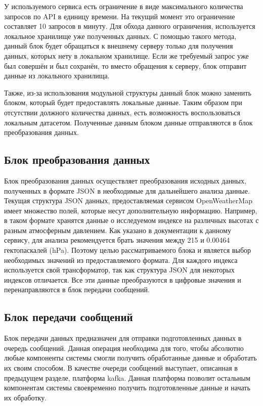У используемого сервиса есть ограничение в виде максимального количества запросов по API в единицу времени.
На текущий момент это ограничение составляет 10 запросов в минуту.
Для обхода данного ограничения, используется локальное хранилище уже полученных данных.
С помощью такого метода, данный блок будет обращаться к внешнему серверу только для получения данных, которых нету в локальном хранилище.
Если же требуемый запрос уже был совершён и был сохранён, то вместо обращения к серверу, блок отправит данные из локального хранилища.

Также, из-за использования модульной структуры данный блок можно заменить блоком, который будет предоставлять локальные данные.
Таким образом при отсутствии должного количества данных, есть возможность воспользоваться локальным датасетом.
Полученные данным блоком данные отправляются в блок преобразования данных.

\subsection{Блок преобразования данных}

Блок преобразования данных осуществляет преобразования исходных данных, полученных в формате JSON в необходимые для дальнейшего анализа данные.
Текущая структура JSON данных, предоставляемая сервисом OpenWeatherMap имеет множество полей, которые несут дополнительную информацию.
Например, в таком формате хранятся данные о исследуемом индексе на различных высотах с разным атмосферным давлением.
Как указано в документации к данному сервису, для анализа рекомендуется брать значения между 215 и 0.00464 гектопаскалей (hPa).
Поэтому целью рассматриваемого блока и является выбор необходимых значений из предоставляемого формата.
Для каждого индекса используется свой трансформатор, так как структура JSON для некоторых индексов отличается.
Все эти данные преобразуются в цифровые значения и перенаправляются в блок передачи сообщений.

\subsection{Блок передачи сообщений}

Блок передачи данных предназначен для отправки подготовленных данных в очередь сообщений.
Данная операция необходима для того, чтобы абсолютно любые компоненты системы смогли получить обработанные данные и обработать их своим способом.
В качестве очереди сообщений выступает, описанная в предыдущем разделе, платформа kafka.
Данная платформа позволит остальным компонентам системы своевременно получить подготовленные данные и начать их обработку.

